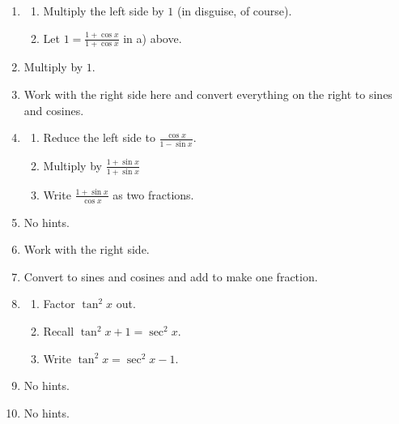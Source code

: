 \documentclass[english]{book}
\begin{document}
\begin{enumerate}
\begin{enumerate}
\begin{enumerate}[\hspace{1cm}a)]
                  I can imagine what you're thinking. What blue sky rack did \emph{that} come from? Experience is probably the best answer. And these problems will give you some experience in such witchcraft so that you will look for such things in your future attempts to untie algebraic knots.
          \end{enumerate}
    \item \begin{enumerate}[\hspace{1cm}a)]
            \item Multiply the left side by $1$ (in disguise, of course).
            \item Let $1 = \frac{1 + \cos x}{1 + \cos x}$ in a) above.
          \end{enumerate}
    \item Multiply by $1$.
    \item Work with the right side here and convert everything on the right to sines and cosines.
    \item \begin{enumerate}[\hspace{1cm}a)]
            \item Reduce the left side to $\frac{\cos x}{1- \sin x}$.
            \item Multiply by $\frac{1+ \sin x}{1+ \sin x}$
            \item Write $\frac{1+ \sin x}{\cos x}$ as two fractions.
          \end{enumerate}
    \item No hints.
    \item Work with the right side.
    \item Convert to sines and cosines and add to make one fraction.
    \item \begin{enumerate}[\hspace{1cm}a)]
            \item Factor $\tan^{2} x$ out.
            \item Recall $\tan^{2} x + 1 = \sec^{2} x$.
            \item Write $\tan^{2} x = \sec^{2} x - 1$.
          \end{enumerate}
    \item No hints.
    \item No hints.
  \end{enumerate}


\end{enumerate}
\end{document}
